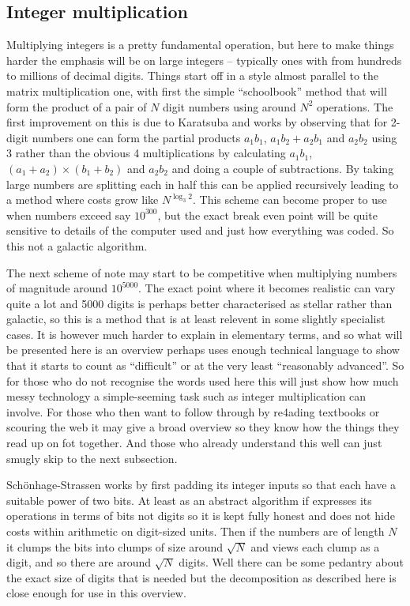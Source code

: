 \subsection{Integer multiplication}
Multiplying integers is a pretty fundamental operation, but here to
make things harder the emphasis will be on large integers -- typically
ones with from hundreds to millions of decimal digits. Things start
off in a style almost parallel to the matrix multiplication one,
with first the simple ``schoolbook'' method that will form the
product of a pair of $N$ digit numbers using around $N^2$ operations.
The first improvement on this is due to Karatsuba\cite{karatsuba} and
works by observing that for 2-digit numbers one can form the
partial products
$a_{1}b_{1}$,
$a_{1}b_{2} + a_{2}b_{1}$
and $a_{2}b_{2}$
using 3 rather than the obvious 4 multiplications by calculating
$a_{1}b_{1}$,
$(a_{1}+a_{2})\times(b_{1}+b_{2})$
and $a_{2}b_{2}$ and doing a couple
of subtractions. By taking large numbers are splitting each in half
this can be applied recursively leading to a method where costs
grow like $N^{\log_{3} 2}$. This scheme can become proper to
use when numbers exceed say $10^{300}$, but the exact break even point will
be quite sensitive to details of the computer used and just how everything
was coded. So this not a galactic algorithm.

The next scheme of note may start to be competitive when multiplying
numbers of magnitude around $10^{5000}$. The exact point where it becomes
realistic can vary quite a lot and 5000 digits is perhaps better
characterised as stellar rather than galactic, so this is a method that
is at least relevent in some slightly specialist cases. It is however
much harder to explain in elementary terms, and so what will be presented
here is an overview perhaps uses enough technical language to show
that it starts to count as ``difficult'' or at the very least ``reasonably
advanced''. So for those who do not recognise the words used here this
will just show how much messy technology a simple-seeming task such as
integer multiplication can involve. For those who then want to follow
through by re4ading textbooks or scouring the web it may give a broad
overview so they know how the things they read up on fot together. And
those who already understand this well can just smugly skip to the next
subsection.

Sch\"{o}nhage-Strassen works by first padding its integer inputs so that
each have a suitable power of two bits. At least as an abstract algorithm
if expresses its operations in terms of bits not digits so it is kept
fully honest and does not hide costs within arithmetic on digit-sized
units. Then if the numbers are of length $N$ it clumps the bits into
clumps of size around $\sqrt N$ and views each clump as a digit, and so
there are around $\sqrt N$ digits. Well there can be some pedantry about the
exact size of digits that is needed but the decomposition as described
here is close enough for use in this overview.

